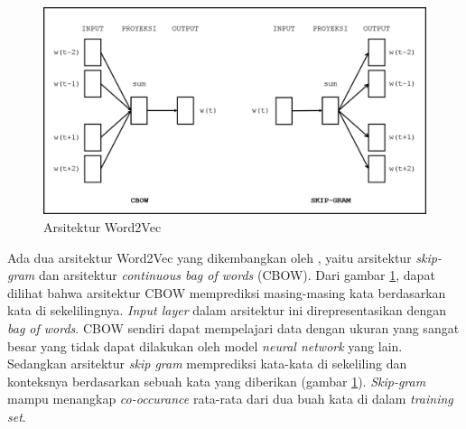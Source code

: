 \begin{figure}
	\centering
	\includegraphics[width=0.85\linewidth]{images/word2vec}
	\caption{Arsitektur Word2Vec}
	\label{fig:word2vec}
\end{figure}

Ada dua arsitektur Word2Vec yang dikembangkan oleh \cite{mikolov2014word2vec}, yaitu arsitektur \textit{skip-gram} dan arsitektur \textit{continuous bag of words} (CBOW). Dari gambar \ref{fig:word2vec}, dapat dilihat bahwa arsitektur CBOW memprediksi masing-masing kata berdasarkan kata di sekelilingnya. \textit{Input layer} dalam arsitektur ini direpresentasikan dengan \textit{bag of words}. CBOW sendiri dapat mempelajari data dengan ukuran yang sangat besar yang tidak dapat dilakukan oleh model \textit{neural network} yang lain. Sedangkan arsitektur \textit{skip gram} memprediksi kata-kata di sekeliling dan konteksnya berdasarkan sebuah kata yang diberikan (gambar \ref{fig:word2vec}). \textit{Skip-gram} mampu menangkap \textit{co-occurance} rata-rata dari dua buah kata di dalam \textit{training set}.
